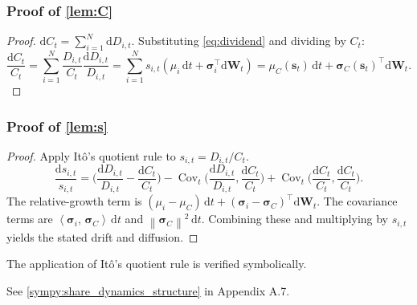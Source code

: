 \documentclass[11pt,letterpaper,oneside]{article}
\numberwithin{equation}{section}
\DeclareMathOperator{\Cov}{\mathrm{Cov}}
\newcommand{\1}{\mathbf{1}}
\newcommand{\diff}{\mathrm{d}}
\newcommand{\norm}[1]{\left\lVert #1\right\rVert}
\newcommand{\ip}[2]{\left\langle #1,\,#2\right\rangle}
\begin{document}
\subsubsection{Proof of \cref{lem:C}}\label{app:proof:lem:C}
\begin{proof}
$\diff C_t = \sum_{i=1}^N \diff D_{i,t}$. Substituting \cref{eq:dividend} and dividing by $C_t$:
\[
  \frac{\diff C_t}{C_t} = \sum_{i=1}^N \frac{D_{i,t}}{C_t} \frac{\diff D_{i,t}}{D_{i,t}} = \sum_{i=1}^N s_{i,t} (\mu_i\,\diff t + \bm{\sigma}_i^{\top}\diff \bm W_t) = \mu_C(\bm{s}_t)\,\diff t + \bm{\sigma}_C(\bm{s}_t)^{\top}\diff \bm{W}_t.
\]
\end{proof}

\subsubsection{Proof of \cref{lem:s}}\label{app:proof:lem:s}
\begin{proof}
Apply It\^o's quotient rule to $s_{i,t} = D_{i,t}/C_t$.
\[
  \frac{\diff s_{i,t}}{s_{i,t}} = \Big(\frac{\diff D_{i,t}}{D_{i,t}}-\frac{\diff C_t}{C_t}\Big) - \Cov_t\Big(\frac{\diff D_{i,t}}{D_{i,t}}, \frac{\diff C_t}{C_t}\Big) + \Cov_t\Big(\frac{\diff C_t}{C_t}, \frac{\diff C_t}{C_t}\Big).
\]
The relative-growth term is $(\mu_i-\mu_C)\,\diff t + (\bm{\sigma}_i-\bm{\sigma}_C)^{\top}\diff\bm{W}_t$.
The covariance terms are $\ip{\bm{\sigma}_i}{\bm{\sigma}_C}\,\diff t$ and $
\norm{\bm{\sigma}_C}^2\,\diff t$.
Combining these and multiplying by $s_{i,t}$ yields the stated drift and diffusion.
\end{proof}

\begin{sympycheck}[title={Verification: Share dynamics (Symbolic structure)}]
The application of It\^o's quotient rule is verified symbolically.

See \cref{sympy:share_dynamics_structure} in Appendix A.7.\end{sympycheck}
\end{document}
